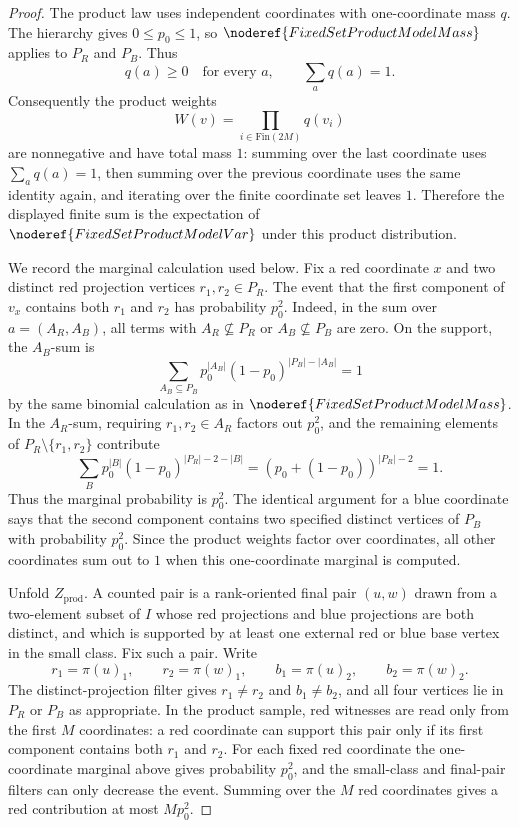\begin{proof}
The product law uses independent coordinates with one-coordinate mass \(q\).
The hierarchy gives \(0\le p_0\le1\), so
\(\noderef{FixedSetProductModelMass}\) applies to \(P_R\) and \(P_B\).  Thus
\[
q(a)\ge0\quad\text{for every }a,\qquad \sum_a q(a)=1.
\]
Consequently the product weights
\[
W(v)=\prod_{i\in\mathrm{Fin}(2M)}q(v_i)
\]
are nonnegative and have total mass \(1\): summing over the last coordinate
uses \(\sum_aq(a)=1\), then summing over the previous coordinate uses the same
identity again, and iterating over the finite coordinate set leaves \(1\).
Therefore the displayed finite sum is the expectation of
\(\noderef{FixedSetProductModelVar}\) under this product distribution.

We record the marginal calculation used below.  Fix a red coordinate \(x\) and
two distinct red projection vertices \(r_1,r_2\in P_R\).  The event that the
first component of \(v_x\) contains both \(r_1\) and \(r_2\) has probability
\(p_0^2\).  Indeed, in the sum over \(a=(A_R,A_B)\), all terms with
\(A_R\not\subseteq P_R\) or \(A_B\not\subseteq P_B\) are zero.  On the support,
the \(A_B\)-sum is
\[
\sum_{A_B\subseteq P_B}
  p_0^{|A_B|}(1-p_0)^{|P_B|-|A_B|}=1
\]
by the same binomial calculation as in
\(\noderef{FixedSetProductModelMass}\).  In the \(A_R\)-sum, requiring
\(r_1,r_2\in A_R\) factors out \(p_0^2\), and the remaining elements of
\(P_R\setminus\{r_1,r_2\}\) contribute
\[
\sum_B p_0^{|B|}(1-p_0)^{|P_R|-2-|B|}
=(p_0+(1-p_0))^{|P_R|-2}=1.
\]
Thus the marginal probability is \(p_0^2\).  The identical argument for a blue
coordinate says that the second component contains two specified distinct
vertices of \(P_B\) with probability \(p_0^2\).  Since the product weights
factor over coordinates, all other coordinates sum out to \(1\) when this
one-coordinate marginal is computed.

Unfold \(Z_{\mathrm{prod}}\).  A counted pair is a rank-oriented final pair
\((u,w)\) drawn from a two-element subset of \(I\) whose red projections and
blue projections are both
distinct, and which is supported by at least one external red or blue base
vertex in the small class.  Fix such a pair.  Write
\[
r_1=\pi(u)_1,\qquad r_2=\pi(w)_1,\qquad
b_1=\pi(u)_2,\qquad b_2=\pi(w)_2.
\]
The distinct-projection filter gives \(r_1\ne r_2\) and \(b_1\ne b_2\), and
all four vertices lie in \(P_R\) or \(P_B\) as appropriate.  In the product
sample, red witnesses are read only from the first \(M\) coordinates: a red
coordinate can support this pair only if its first component contains both
\(r_1\) and \(r_2\).  For each fixed red coordinate the one-coordinate
marginal above gives probability \(p_0^2\), and the small-class and final-pair
filters can only decrease the event.  Summing over the \(M\) red coordinates
gives a red contribution at most \(Mp_0^2\).


\end{proof}
